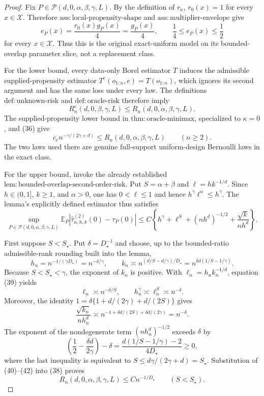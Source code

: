 \documentclass{article}
\begin{document}
\begin{proof}
Fix \(P\in\mathcal P(d,0,\alpha,\beta,\gamma,L)\).  By the definition of \(r_{\kappa}\), \(r_0(x)=1\) for every \(x\in\mathcal X\).  Therefore \(\mathrm{ass:local\mbox{-}propensity\mbox{-}shape}\) and \(\mathrm{ass:multiplier\mbox{-}envelope}\) give
\[
 e_P(x)=\frac{r_0(x)g_P(x)}4=\frac{g_P(x)}4,
 \qquad
 \frac14\leq e_P(x)\leq\frac12
 \tag{35}
\]
for every \(x\in\mathcal X\).  Thus this is the original exact-uniform model on its bounded-overlap parameter slice, not a replacement class.

For the lower bound, every data-only Borel estimator \(T\) induces the admissible supplied-propensity estimator \(T^e(o_{1:n},e)=T(o_{1:n})\), which ignores its second argument and has the same loss under every law.  The definitions \(\mathrm{def:unknown\mbox{-}risk}\) and \(\mathrm{def:oracle\mbox{-}risk}\) therefore imply
\[
 R_n^e(d,0,\beta,\gamma,L)
 \leq R_n(d,0,\alpha,\beta,\gamma,L).
 \tag{36}
\]
The supplied-propensity lower bound in \(\mathrm{thm:oracle\mbox{-}minimax}\), specialized to \(\kappa=0\), and (36) give
\[
 c_e n^{-\gamma/(2\gamma+d)}
 \leq R_n(d,0,\alpha,\beta,\gamma,L)
 \qquad(n\geq2).
 \tag{37}
\]
The two laws used there are genuine full-support uniform-design Bernoulli laws in the exact class.

For the upper bound, invoke the already established \(\mathrm{lem:bounded\mbox{-}overlap\mbox{-}second\mbox{-}order\mbox{-}risk}\).  Put \(S=\alpha+\beta\) and \(\ell=hk^{-1/d}\).  Since \(h\in(0,1]\), \(k\geq1\), and \(\alpha>0\), one has \(0<\ell\leq1\) and hence \(h^\gamma\ell^\alpha\leq h^\gamma\).  The lemma's explicitly defined estimator thus satisfies
\[
 \sup_{P\in\mathcal P(d,0,\alpha,\beta,\gamma,L)}
 \mathbb E_P\left|\widehat\tau^{(2)}_{n,h,k}(0)-\tau_P(0)\right|
 \leq C\left\{h^\gamma+\ell^S+(nh^d)^{-1/2}
 +\frac{\sqrt{k}}{nh^d}\right\}.
 \tag{38}
\]

First suppose \(S<S_\star\).  Put \(\delta=D_\star^{-1}\) and choose, up to the bounded-ratio admissible-rank rounding built into the lemma,
\[
 h_n=n^{-1/(\gamma D_\star)}=n^{-\delta/\gamma},
 \qquad
 k_n\asymp n^{(d/S-d/\gamma)/D_\star}
 =n^{\delta d(1/S-1/\gamma)}.
 \tag{39}
\]
Because \(S<S_\star<\gamma\), the exponent of \(k_n\) is positive.  With \(\ell_n=h_nk_n^{-1/d}\), equation (39) yields
\[
 \ell_n\asymp n^{-\delta/S},
 \qquad
 h_n^\gamma\asymp\ell_n^S\asymp n^{-\delta}.
 \tag{40}
\]
Moreover, the identity \(1=\delta\{1+d/(2\gamma)+d/(2S)\}\) gives
\[
 \frac{\sqrt{k_n}}{nh_n^d}
 \asymp n^{-1+\delta d/(2S)+\delta d/(2\gamma)}
 =n^{-\delta}.
 \tag{41}
\]
The exponent of the nondegenerate term \((nh_n^d)^{-1/2}\) exceeds \(\delta\) by
\[
 \left(\frac12-\frac{\delta d}{2\gamma}\right)-\delta
 =\frac{d(1/S-1/\gamma)-2}{4D_\star}\geq0,
 \tag{42}
\]
where the last inequality is equivalent to \(S\leq d\gamma/(2\gamma+d)=S_\star\).  Substitution of (40)--(42) into (38) proves
\[
 R_n(d,0,\alpha,\beta,\gamma,L)\leq Cn^{-1/D_\star}
 \qquad(S<S_\star).
 \tag{43}
\]


\end{proof}
\end{document}
